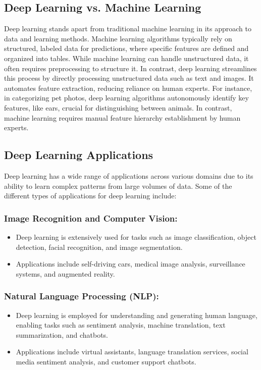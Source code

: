 \subsection{Deep Learning vs. Machine Learning}

Deep learning stands apart from traditional machine learning in its approach to data and learning methods.
Machine learning algorithms typically rely on structured, labeled data for predictions, where specific features are defined and organized into tables.
While machine learning can handle unstructured data, it often requires preprocessing to structure it. In contrast, deep learning streamlines this process by directly processing unstructured data such as text and images. It automates feature extraction, reducing reliance on human experts. For instance, in categorizing pet photos, deep learning algorithms autonomously identify key features, like ears, crucial for distinguishing between animals. In contrast, machine learning requires manual feature hierarchy establishment by human experts.

\subsection{Deep Learning Applications}

Deep learning has a wide range of applications across various domains due to its ability to learn complex patterns from large volumes of data. Some of the different types of applications for deep learning include:

\subsubsection*{Image Recognition and Computer Vision:}

\begin{itemize}
    \item Deep learning is extensively used for tasks such as image classification, object detection, facial recognition, and image segmentation.
    \item Applications include self-driving cars, medical image analysis, surveillance systems, and augmented reality.
\end{itemize}

\subsubsection*{Natural Language Processing (NLP):}

\begin{itemize}
    \item Deep learning is employed for understanding and generating human language, enabling tasks such as sentiment analysis, machine translation, text summarization, and chatbots.
    \item Applications include virtual assistants, language translation services, social media sentiment analysis, and customer support chatbots.
\end{itemize}

